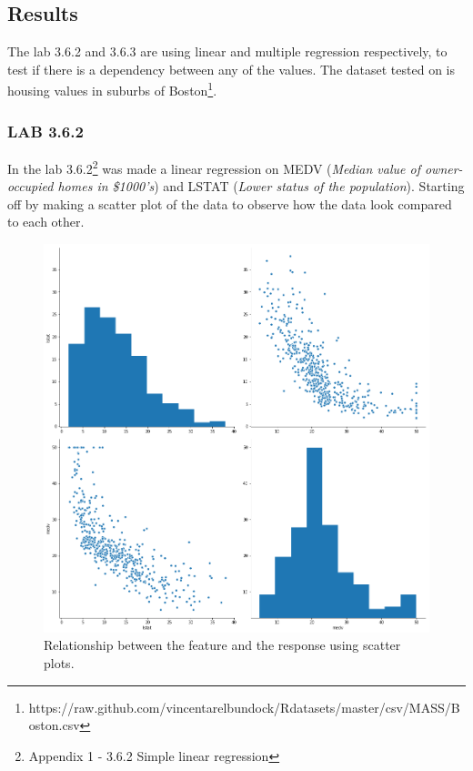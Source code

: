 \subsection{Results}
The lab 3.6.2 and 3.6.3 are using linear and multiple regression respectively, to test if there is a dependency between any of the values. The dataset tested on is housing values in suburbs of Boston\footnote{https://raw.github.com/vincentarelbundock/Rdatasets/master/csv/MASS/Boston.csv}.

\subsubsection*{LAB 3.6.2}
In the lab 3.6.2\footnote{Appendix 1 - 3.6.2 Simple linear regression} was made a linear regression on MEDV (\textit{Median value of owner-occupied homes in \$1000's}) and LSTAT (\textit{Lower status of the population}). Starting off by making a scatter plot of the data to observe how the data look compared to each other.

\begin{figure}[h]
	\centering
	\includegraphics[scale=0.4, trim=0 0 0 500, clip=true]{regression/multipleLinearRegression/fig/bostonPairplotMdevLstat.png}
	\caption{Relationship between the feature and the response using scatter plots.}
	\label{fig:bostonPairplotMdevLstat}
\end{figure}

